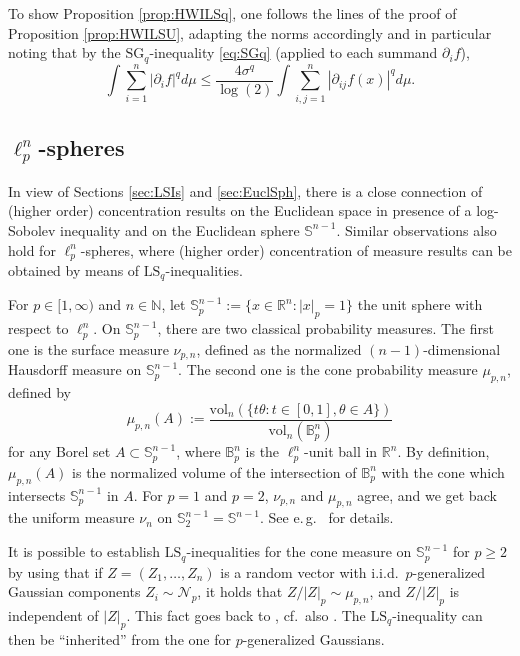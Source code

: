 \documentclass[a4paper,12pt]{amsart}
\numberwithin{equation}{section}
\theoremstyle{remark}
\def\R{{\mathbb R}}
\def\N{{\mathbb N}}
\def\S{{\mathbb S}}
\def\vol{{\mathrm{vol}}}
\def\LSq{{\mathrm{LS}_q}}
\begin{document}
To show Proposition \ref{prop:HWILSq}, one follows the lines of the proof of Proposition \ref{prop:HWILSU}, adapting the norms accordingly and in particular noting that by the $\mathrm{SG}_q$-inequality \eqref{eq:SGq} (applied to each summand $\partial_i f$),
    \[
    \int \sum_{i=1} ^n |\partial_i f|^q d\mu \le \frac{4\sigma^q}{\log(2)} \int \sum_{i,j=1}^n |\partial_{ij} f(x)|^q d\mu.
    \]

\subsection{\texorpdfstring{$\ell_p^n$}{l\_p\^n}-spheres}

In view of Sections \ref{sec:LSIs} and \ref{sec:EuclSph}, there is a close connection of (higher order) concentration results on the Euclidean space in presence of a log-Sobolev inequality and on the Euclidean sphere $\S^{n-1}$. Similar observations also hold for $\ell_p^n$-spheres, where (higher order) concentration of measure results can be obtained by means of $\LSq$-inequalities.

For $p \in [1,\infty)$ and $n \in \N$, let $\S_p^{n-1} := \{ x \in \R^n \colon \lvert x \rvert_p = 1\}$ the unit sphere with respect to $\ell_p^n$. On $\S_p^{n-1}$, there are two classical probability measures. The first one is the surface measure $\nu_{p,n}$, defined as the normalized $(n-1)$-dimensional Hausdorff measure on $\S_p^{n-1}$. The second one is the cone probability measure $\mu_{p,n}$, defined by
\[
\mu_{p,n}(A) := \frac{\vol_n(\{t\theta \colon t \in [0,1], \theta \in A\})}{\vol_n(\mathbb{B}_p^n)}
\]
for any Borel set $A \subset \S_p^{n-1}$, where $\mathbb{B}_p^n$ is the $\ell_p^n$-unit ball in $\R^n$. By definition, $\mu_{p,n}(A)$ is the normalized volume of the intersection of $\mathbb{B}_p^n$ with the cone which intersects $\S_p^{n-1}$ in $A$. For $p=1$ and $p=2$, $\nu_{p,n}$ and $\mu_{p,n}$ agree, and we get back the uniform measure $\nu_n$ on $\S_2^{n-1} = \S^{n-1}$. See e.\,g.\ \cite[Sect.\ 9.3.1]{PTT19} for details.

It is possible to establish $\mathrm{LS}_q$-inequalities for the cone measure on $\S_p^{n-1}$ for $p \ge 2$ by using that if $Z = (Z_1,\ldots,Z_n)$ is a random vector with i.i.d.\ $p$-generalized Gaussian components $Z_i \sim \mathcal{N}_p$, it holds that $Z/\lvert Z \rvert_p \sim \mu_{p,n}$, and $Z/\lvert Z \rvert_p$ is independent of $\lvert Z \rvert_p$. This fact goes back to \cite{SZ90,RR91}, cf.\ also \cite[Th.\ 9.3.2]{PTT19}. The $\mathrm{LS}_q$-inequality can then be ``inherited'' from the one for $p$-generalized Gaussians.
\end{document}
